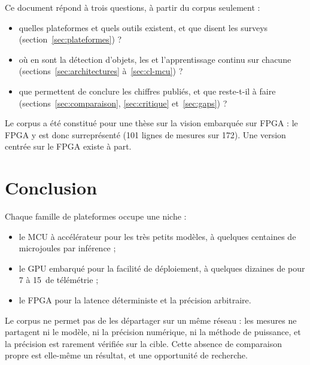 \documentclass[11pt,a4paper]{article}
\begin{document}
Ce document répond à trois questions, à partir du corpus seulement :
\begin{itemize}
  \item quelles plateformes et quels outils existent, et que disent les surveys
    (section~\ref{sec:plateformes}) ?
  \item où en sont la détection d'objets, les  et l'apprentissage continu sur
    chacune (sections~\ref{sec:architectures} à~\ref{sec:cl-mcu}) ?
  \item que permettent de conclure les chiffres publiés, et que reste-t-il à faire
    (sections~\ref{sec:comparaison}, \ref{sec:critique} et~\ref{sec:gaps}) ?
\end{itemize}
Le corpus a été constitué pour une thèse sur la vision embarquée sur FPGA : le FPGA y est
donc surreprésenté (101 lignes de mesures sur 172). Une version centrée sur le FPGA existe
à part.















\section{Conclusion}

Chaque famille de plateformes occupe une niche :
\begin{itemize}
  \item le MCU à accélérateur pour les très petits modèles, à quelques centaines de
    microjoules par inférence ;
  \item le GPU embarqué pour la facilité de déploiement, à quelques dizaines de  pour
    7 à 15\, de télémétrie ;
  \item le FPGA pour la latence déterministe et la précision arbitraire.
\end{itemize}
Le corpus ne permet pas de les départager sur un même réseau : les mesures ne partagent ni
le modèle, ni la précision numérique, ni la méthode de puissance, et la précision est
rarement vérifiée sur la cible. Cette absence de comparaison propre est elle-même un
résultat, et une opportunité de recherche.
\end{document}
